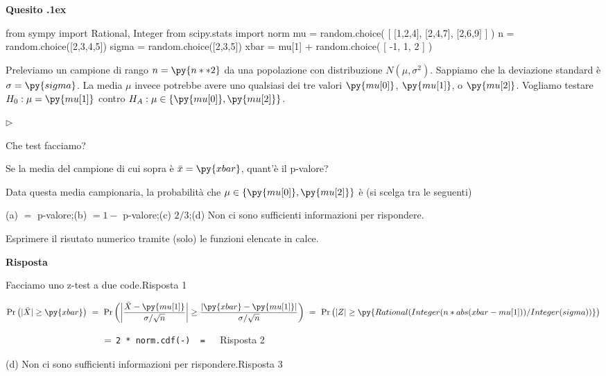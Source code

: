 \documentclass[11pt,twoside,a4paper]{article}
\newcommand{\mylabel}[1]{#1\hfill}
\renewenvironment{itemize}
  {\begin{list}{$\triangleright$}{%
   \setlength{\parskip}{0mm}
   \setlength{\topsep}{.4\baselineskip}
   \setlength{\rightmargin}{0mm}
   \setlength{\listparindent}{0mm}
   \setlength{\itemindent}{0mm}
   \setlength{\labelwidth}{2ex}
   \setlength{\itemsep}{.4\baselineskip}
   \setlength{\parsep}{0mm}
   \setlength{\partopsep}{0mm}
   \setlength{\labelsep}{1ex}
   \setlength{\leftmargin}{\labelwidth+\labelsep}
   \let\makelabel\mylabel}}{%
   \end{list}\vspace*{-1.3mm}}
\def\Pr{{\rm Pr\,}}
\newcounter{quesito}
\newenvironment{question}{\bigskip\addtocounter{quesito}{1}\par\textbf{Quesito \thequesito.\kern1ex}}{\vspace{\parskip}}
\newenvironment{answer}{\par\textbf{Risposta\quad}}{\vspace{\parskip}}
\begin{document}
\begin{question} %
\begin{pycode}
from sympy import Rational, Integer
from scipy.stats import norm
mu = random.choice( [ [1,2,4], [2,4,7], [2,6,9] ] ) 
n = random.choice([2,3,4,5])
sigma = random.choice([2,3,5])
xbar = mu[1] + random.choice( [ -1, 1, 2 ] ) 
\end{pycode}
Preleviamo un campione di rango $n=\py{n**2}$ da una popolazione con distribuzione $N(\mu,\sigma^2)$. Sappiamo che la deviazione standard è $\sigma=\py{sigma}$. La media $\mu$ invece potrebbe avere uno qualsiasi dei tre valori $\py{mu[0]}$, $\py{mu[1]}$, o $\py{mu[2]}$.
Vogliamo testare $H_0:\mu=\py{mu[1]}$ contro $H_A:\mu\in\{\py{mu[0]},\py{mu[2]}\}$.
\begin{itemize}
\item[1.] Che test facciamo?
\item[2.] Se la media del campione di cui sopra è $\bar x=\py{xbar}$, quant'è il p-valore?
\item[3.] Data questa media campionaria, la probabilità che $\mu\in\{\py{mu[0]},\py{mu[2]}\}$ è (si scelga tra le seguenti)\medskip

(a) $=$ p-valore;\hfill (b) $=1-$ p-valore;\hfill (c) $2/3$;\hfill (d) Non ci sono sufficienti informazioni per rispondere.
\end{itemize}

Esprimere il risutato numerico tramite (solo) le funzioni elencate in calce.
\begin{answer}

{\color{blue}Facciamo uno z-test a due code.\hfill Risposta 1}

$\Pr\big(|\bar X|\ge\py{xbar}\big)\ =\ \Pr\bigg(\bigg|\dfrac{\bar X-\py{mu[1]}}{\sigma/\sqrt{n}}\bigg|\ge\dfrac{|\py{xbar}-\py{mu[1]}| }{\sigma/\sqrt{n} }\bigg)\ =\ \Pr\big(|Z|\ge\py{Rational(Integer(n*abs(xbar-mu[1]) ) / Integer(sigma) ) }\big)$

$\phantom{\Pr\big(|\bar X|\ge\py{xbar}\big)}\ =\ ${\color{blue}\tt 2 * norm.cdf(-) }{\tt\ =  \  }{\color{blue}\hfill Risposta 2}

\medskip
{\color{blue}(d) Non ci sono sufficienti informazioni per rispondere.\hfill Risposta 3}

\end{answer}
\end{question}
\end{document}
